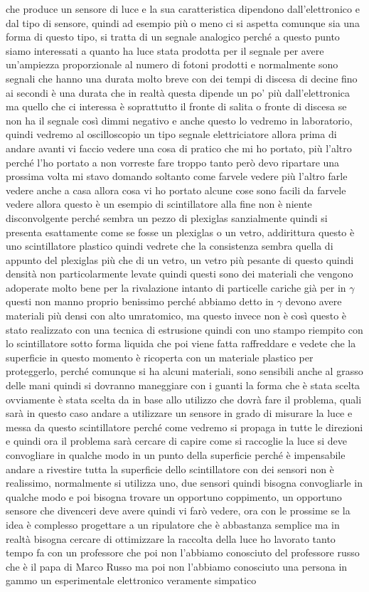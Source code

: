 che produce un sensore di luce e la sua caratteristica dipendono dall'elettronico e dal tipo di sensore, quindi ad esempio più o meno ci si aspetta comunque sia una forma di questo tipo, si tratta di un segnale analogico perché a questo punto siamo interessati a quanto ha luce stata prodotta per il segnale per avere un'ampiezza proporzionale al numero di fotoni prodotti e normalmente sono segnali che hanno una durata molto breve con dei tempi di discesa di decine fino ai secondi è una durata che in realtà questa dipende un po' più dall'elettronica ma quello che ci interessa è soprattutto il fronte di salita o fronte di discesa se non ha il segnale così dimmi negativo e anche questo lo vedremo in laboratorio, quindi vedremo al oscilloscopio un tipo segnale elettriciatore allora prima di andare avanti vi faccio vedere una cosa di pratico che mi ho portato, più l'altro perché l'ho portato a non vorreste fare troppo tanto però devo ripartare una prossima volta mi stavo domando soltanto come farvele vedere più l'altro farle vedere anche a casa allora cosa vi ho portato alcune cose sono facili da farvele vedere allora questo è un esempio di scintillatore alla fine non è niente disconvolgente perché sembra un pezzo di plexiglas sanzialmente quindi si presenta esattamente come se fosse un plexiglas o un vetro, addirittura questo è uno scintillatore plastico quindi vedrete che la consistenza sembra quella di appunto del plexiglas più che di un vetro, un vetro più pesante di questo quindi densità non particolarmente levate quindi questi sono dei materiali che vengono adoperate molto bene per la rivalazione intanto di particelle cariche già per in $\gamma$ questi non manno proprio benissimo perché abbiamo detto in $\gamma$ devono avere materiali più densi con alto umratomico, ma questo invece non è così questo è stato realizzato con una tecnica di estrusione quindi con uno stampo riempito con lo scintillatore sotto forma liquida che poi viene fatta raffreddare e vedete che la superficie in questo momento è ricoperta con un materiale plastico per proteggerlo, perché comunque si ha alcuni materiali, sono sensibili anche al grasso delle mani quindi si dovranno maneggiare con i guanti la forma che è stata scelta ovviamente è stata scelta da in base allo utilizzo che dovrà fare il problema, quali sarà in questo caso andare a utilizzare un sensore in grado di misurare la luce e messa da questo scintillatore perché come vedremo si propaga in tutte le direzioni e quindi ora il problema sarà cercare di capire come si raccoglie la luce si deve convogliare in qualche modo in un punto della superficie perché è impensabile andare a rivestire tutta la superficie dello scintillatore con dei sensori non è realissimo, normalmente si utilizza uno, due sensori quindi bisogna convogliarle in qualche modo e poi bisogna trovare un opportuno coppimento, un opportuno sensore che divenceri deve avere quindi vi farò vedere, ora con le prossime se la idea è complesso progettare a un ripulatore che è abbastanza semplice ma in realtà bisogna cercare di ottimizzare la raccolta della luce ho lavorato tanto tempo fa con un professore che poi non l'abbiamo conosciuto del professore russo che è il papa di Marco Russo ma poi non l'abbiamo conosciuto una persona in gammo un esperimentale elettronico veramente simpatico 